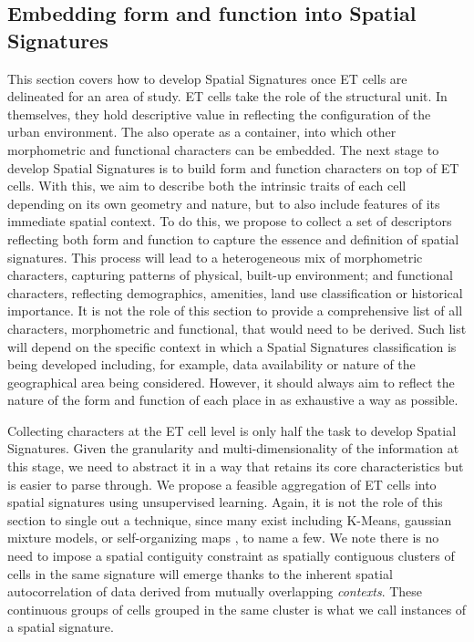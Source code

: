 \subsection{Embedding form and function into Spatial Signatures}
\label{ssec:ss_ff}

%
This section covers how to develop Spatial Signatures once ET cells are
delineated for an area of study.
ET cells take the role of the structural unit.
In themselves, they hold descriptive value in reflecting the configuration of
the urban environment. The also operate as a container, into which other
morphometric and functional characters can be embedded.
The next stage to develop Spatial Signatures is to build form and function
characters on top of ET cells. With this, we aim to describe both the
intrinsic traits of each cell depending on its own
geometry and nature, but to also include features of its immediate spatial
context.
To do this, we propose to collect a set of descriptors reflecting both form
and function to capture the essence and definition of spatial signatures.
%
This process will lead to a heterogeneous
mix of morphometric characters, capturing patterns of physical, built-up
environment; and functional characters, reflecting demographics, amenities,
land use classification or historical importance.
It is not the role of this
section to provide a comprehensive list of all characters, morphometric and
functional, that would need to be derived. Such list will depend on the
specific context in which a Spatial Signatures classification is being
developed including, for example, data availability or nature of the
geographical area being considered.
%
However, it should always aim to reflect the nature of the form and function
of each place in as exhaustive a way as possible.

Collecting characters at the ET cell level is only half the task to develop
Spatial Signatures. Given the granularity and multi-dimensionality of the
information at this stage, we need to abstract it in a way that retains its
core characteristics but is easier to parse through.
%
We propose a feasible aggregation of ET cells into
spatial signatures using unsupervised learning. Again, it is not the role of
this section to single out a technique, since many exist including K-Means,
gaussian mixture models, or self-organizing maps \citep{kohonen1990self}, to
name a few. We note there is no need to impose a spatial contiguity constraint
as spatially contiguous clusters of cells in the same signature will emerge
thanks to the inherent spatial autocorrelation of data derived from mutually
overlapping \textit{contexts}.
%
These continuous groups of cells grouped in the same cluster is what we call
instances of a spatial signature.
